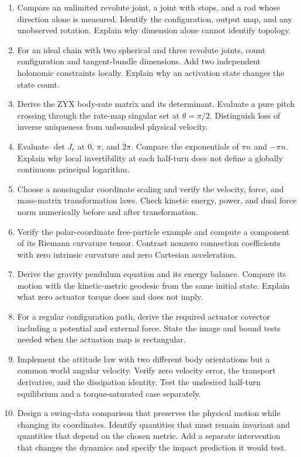 \documentclass[12pt, openany]{book}
\theoremstyle{plain}
\begin{document}
\begin{enumerate}[itemsep=3pt,parsep=0pt]
\item Compare an unlimited revolute joint, a joint with stops, and a rod whose
direction alone is measured. Identify the configuration, output map, and any
unobserved rotation. Explain why dimension alone cannot identify topology.
\item For an ideal chain with two spherical and three revolute joints, count
configuration and tangent-bundle dimensions. Add two independent holonomic
constraints locally. Explain why an activation state changes the state count.
\item Derive the ZYX body-rate matrix and its determinant. Evaluate a pure
pitch crossing through the rate-map singular set at $\theta=\pi/2$.
Distinguish loss of inverse uniqueness from unbounded physical velocity.
\item Evaluate $\det J_r$ at $0$, $\pi$, and $2\pi$. Compare the exponentials
of $\pi n$ and $-\pi n$. Explain why local invertibility at each half-turn
does not define a globally continuous principal logarithm.
\item Choose a nonsingular coordinate scaling and verify the velocity, force,
and mass-matrix transformation laws. Check kinetic energy, power, and dual
force norm numerically before and after transformation.
\item Verify the polar-coordinate free-particle example and compute a component
of its Riemann curvature tensor. Contrast nonzero connection coefficients
with zero intrinsic curvature and zero Cartesian acceleration.
\item Derive the gravity pendulum equation and its energy balance. Compare
its motion with the kinetic-metric geodesic from the same initial state.
Explain what zero actuator torque does and does not imply.
\item For a regular configuration path, derive the required actuator covector
including a potential and external force. State the image and bound tests
needed when the actuation map is rectangular.
\item Implement the attitude law with two different body orientations but a
common world angular velocity. Verify zero velocity error, the transport
derivative, and the dissipation identity. Test the undesired half-turn
equilibrium and a torque-saturated case separately.
\item Design a swing-data comparison that preserves the physical motion while
changing its coordinates. Identify quantities that must remain invariant and
quantities that depend on the chosen metric. Add a separate intervention that
changes the dynamics and specify the impact prediction it would test.
\end{enumerate}
\end{document}

